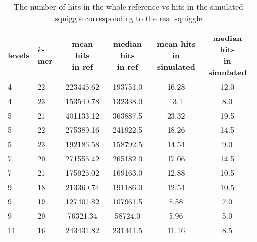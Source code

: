 \begin{table}
\caption[TODO]{The number of hits in the whole reference vs hits in the simulated
squiggle corresponding to the real squiggle}
\label{tab:hitsRefvsSimul}
\begin{center}
\begin{tabular}{|l|l|c|c|c|c|}
\hline
levels & $k$-mer & \specialcell{mean hits\\in ref} & \specialcell{median hits\\in ref} & \specialcell{mean hits\\in simulated} & \specialcell{median hits\\in simulated} \\
\hline
4 & 22 & 223446.62 & 193751.0 & 16.28 & 12.0 \\
\hline
4 & 23 & 153540.78 & 132338.0 & 13.1 & 8.0 \\
\hline
5 & 21 & 401133.12 & 363887.5 & 23.32 & 19.5 \\
\hline
5 & 22 & 275380.16 & 241922.5 & 18.26 & 14.5 \\
\hline
5 & 23 & 192186.58 & 158792.5 & 14.54 & 9.0 \\
\hline
7 & 20 & 271556.42 & 265182.0 & 17.06 & 14.5 \\
\hline
7 & 21 & 175926.02 & 169163.0 & 12.88 & 10.5 \\
\hline
9 & 18 & 213360.74 & 191186.0 & 12.54 & 10.5 \\
\hline
9 & 19 & 127401.82 & 107961.5 & 8.58 & 7.0 \\
\hline
9 & 20 & 76321.34 & 58724.0 & 5.96 & 5.0 \\
\hline
11 & 16 & 243431.82 & 231441.5 & 11.16 & 8.5 \\
\hline
\end{tabular}
\end{center}
\end{table}
